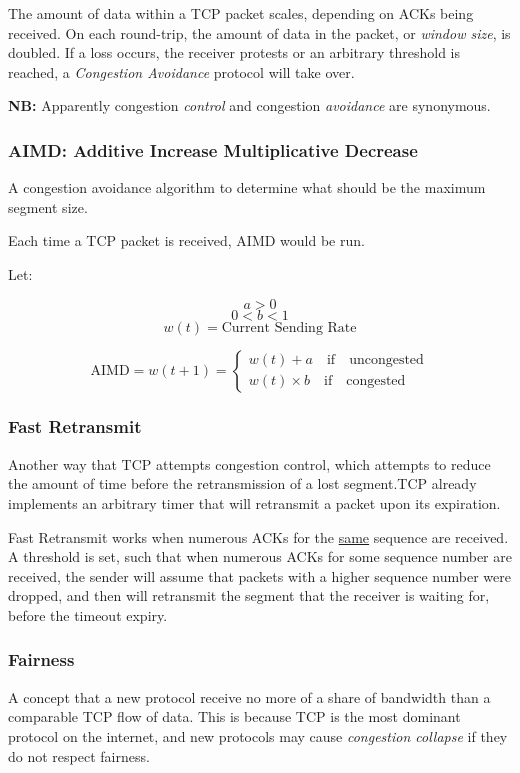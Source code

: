 \documentclass{article}
\begin{document}
 The amount of data within a TCP packet scales, depending on ACKs being received. On each round-trip, the amount of data in the packet, or \textit{window size}, is doubled. If a loss occurs, the receiver protests or an arbitrary threshold is reached, a \textit{Congestion Avoidance} protocol will take over. 

\textbf{NB:} Apparently congestion \textit{control} and congestion \textit{avoidance} are synonymous.

\subsubsection{AIMD: Additive Increase Multiplicative Decrease}

A congestion avoidance algorithm to determine what should be the maximum segment size.

Each time a TCP packet is received, AIMD would be run.

Let:

\[a > 0\]
\[0 < b < 1\]
\[w(t) = \text{Current Sending Rate}\]


\[
\text{AIMD} = w(t + 1) = 
\begin{cases}
  w(t) + a \quad \text{if} \quad \text{uncongested}\\
  w(t) \times b \quad \text{if} \quad \text{congested}
\end{cases}
\]

\subsubsection{Fast Retransmit}

Another way that TCP attempts congestion control, which attempts to reduce the amount of time before the retransmission of a lost segment.TCP already implements an arbitrary timer that will retransmit a packet upon its expiration.

Fast Retransmit works when numerous ACKs for the \underline{same} sequence are received. A threshold is set, such that when numerous ACKs for some sequence number are received, the sender will assume that packets with a higher sequence number were dropped, and then will retransmit the segment that the receiver is waiting for, before the timeout expiry.

\subsubsection{Fairness}

A concept that a new protocol receive no more of a share of bandwidth than a comparable TCP flow of data. This is because TCP is the most dominant protocol on the internet, and new protocols may cause \textit{congestion collapse} if they do not respect fairness.
\end{document}
